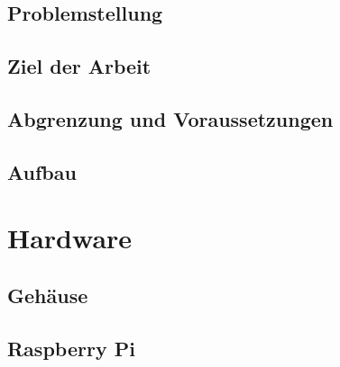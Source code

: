 \documentclass[
    headings=optiontotocandhead,%
    twoside,
    numbers=noenddot,%
    toc=flat, %
    12pt, %
    titlepage, %
    parskip=full, %
    listof=totoc, %
    listof=flat, %
    numbers=noenddot, %
    bibliography=totoc, %
    a4paper,DIV=14,
    BCOR=15mm,
]{scrbook}
\begin{document}
\section{Problemstellung}\label{Problemstellung}

\renewcommand{\kapitelautor}{Autor: Clemens Scharwitzl}

% 

\section{Ziel der Arbeit}\label{Ziel-der-Arbeit}

\renewcommand{\kapitelautor}{Autor: Florian Steiner, Clemens Scharwitzl, Dominik Nußbaumer}

% 

\section{Abgrenzung und Voraussetzungen}\label{Abgrenzung-und-Voraussetzungen}

\renewcommand{\kapitelautor}{Autor: Florian Steiner}

% 

\section{Aufbau}\label{Aufbau}

\renewcommand{\kapitelautor}{Autor: Florian Steiner, Dominik Nußbaumer}

% 

\chapter{Hardware}\label{Hardware}

\section{Gehäuse}\label{Gehäuse}

\renewcommand{\kapitelautor}{Autor: Clemens Scharwitzl}

% 

\section{Raspberry Pi}\label{Raspberry-Pi}
\end{document}
